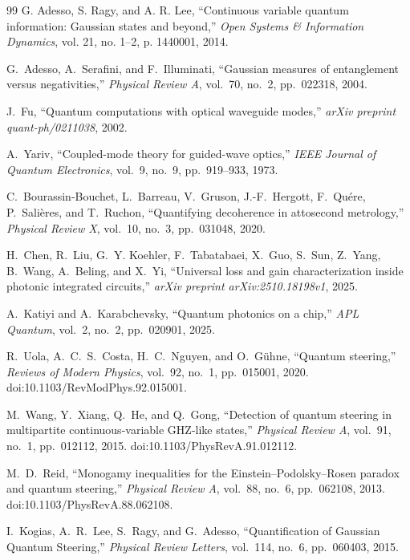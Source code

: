 \begin{thebibliography}{99}
	G. Adesso, S. Ragy, and A. R. Lee, 
	``Continuous variable quantum information: Gaussian states and beyond,'' 
	\textit{Open Systems \& Information Dynamics}, vol. 21, no. 1--2, p. 1440001, 2014. 
	
	G.~Adesso, A.~Serafini, and F.~Illuminati, 
	``Gaussian measures of entanglement versus negativities,'' 
	\textit{Physical Review A}, 
	vol.~70, no.~2, pp.~022318, 2004.
	
	J.~Fu,
	``Quantum computations with optical waveguide modes,''
	\textit{arXiv preprint quant-ph/0211038},
	2002.
	
	A.~Yariv, 
	``Coupled-mode theory for guided-wave optics,'' 
	\textit{IEEE Journal of Quantum Electronics}, vol.~9, no.~9, pp.~919--933, 1973.
	
	C.~Bourassin-Bouchet, L.~Barreau, V.~Gruson, J.-F.~Hergott, F.~Qu\'ere, P.~Sali\`eres, and T.~Ruchon,
	``Quantifying decoherence in attosecond metrology,''
	\textit{Physical Review X}, vol.~10, no.~3, pp.~031048, 2020. 
	
	H.~Chen, R.~Liu, G.~Y. Koehler, F.~Tabatabaei, X.~Guo, S.~Sun, Z.~Yang, B.~Wang, A.~Beling, and X.~Yi,
	``Universal loss and gain characterization inside photonic integrated circuits,''
	\textit{arXiv preprint arXiv:2510.18198v1},
	2025.
	
	A.~Katiyi and A.~Karabchevsky, 
	``Quantum photonics on a chip,''
	\textit{APL Quantum}, 
	vol.~2, no.~2, pp.~020901, 2025.
	
	R.~Uola, A.~C.~S.~Costa, H.~C.~Nguyen, and O.~G\"uhne,
	``Quantum steering,''
	\textit{Reviews of Modern Physics},
	vol.~92, no.~1, pp.~015001, 2020.
	doi:10.1103/RevModPhys.92.015001.
	
	M.~Wang, Y.~Xiang, Q.~He, and Q.~Gong,
	``Detection of quantum steering in multipartite continuous-variable GHZ-like states,''
	\textit{Physical Review A},
	vol.~91, no.~1, pp.~012112, 2015.
	doi:10.1103/PhysRevA.91.012112.
	
	M.~D.~Reid,
	``Monogamy inequalities for the Einstein–Podolsky–Rosen paradox and quantum steering,''
	\textit{Physical Review A},
	vol.~88, no.~6, pp.~062108, 2013.
	doi:10.1103/PhysRevA.88.062108.
	
	I.~Kogias, A.~R.~Lee, S.~Ragy, and G.~Adesso,
	``Quantification of Gaussian Quantum Steering,''
	\textit{Physical Review Letters},
	vol.~114, no.~6, pp.~060403, 2015.
	

\end{thebibliography}
